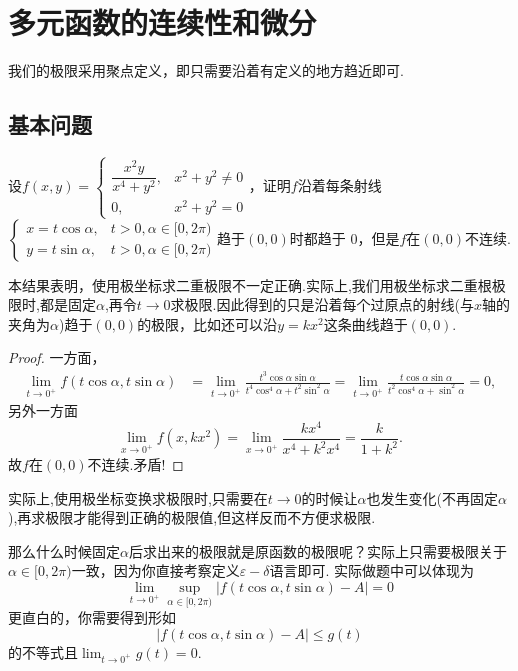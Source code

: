\documentclass[../../main.tex]{subfiles}%
\begin{document}
\section{多元函数的连续性和微分}

我们的极限采用聚点定义，即只需要沿着有定义的地方趋近即可.

\subsection{基本问题}

\begin{example}
设\(f(x,y)=\begin{cases}\dfrac{x^2 y}{x^4 + y^2},&x^2 + y^2 \neq 0\\0,&x^2 + y^2 = 0\end{cases}\)，证明\(f\)沿着每条射线\(\begin{cases}x = t\cos\alpha,&t > 0,\alpha \in [0,2\pi)\\y = t\sin\alpha,&t > 0,\alpha \in [0,2\pi)\end{cases}\)趋于\((0,0)\)时都趋于 0，但是\(f\)在\((0,0)\)不连续.
\end{example}
\begin{note}
本结果表明，使用极坐标求二重极限不一定正确.实际上,我们用极坐标求二重根极限时,都是固定$\alpha$,再令$t\to 0$求极限.因此得到的只是沿着每个过原点的射线(与$x$轴的夹角为$\alpha$)趋于$(0,0)$的极限，比如还可以沿$y=kx^2$这条曲线趋于$(0,0)$.
\end{note}
\begin{proof}
一方面，
\begin{align*}
\lim_{t \to 0^+} f(t\cos\alpha, t\sin\alpha)&=\lim_{t \to 0^+} \frac{t^3 \cos\alpha \sin\alpha}{t^4 \cos^4 \alpha + t^2 \sin^2 \alpha} = \lim_{t \to 0^+} \frac{t \cos\alpha \sin\alpha}{t^2 \cos^4 \alpha + \sin^2 \alpha} = 0,
\end{align*}
另外一方面
\[
\lim_{x \to 0^+} f(x, kx^2)=\lim_{x \to 0^+} \frac{kx^4}{x^4 + k^2 x^4}=\frac{k}{1 + k^2}.
\]
故\(f\)在\((0,0)\)不连续.矛盾!
\end{proof}
\begin{remark}
实际上,使用极坐标变换求极限时,只需要在$t\to 0$的时候让$\alpha$也发生变化(不再固定$\alpha$),再求极限才能得到正确的极限值,但这样反而不方便求极限.

那么什么时候固定$\alpha$后求出来的极限就是原函数的极限呢？实际上只需要极限关于\(\alpha \in [0,2\pi)\)一致，因为你直接考察定义\(\varepsilon - \delta\)语言即可. 实际做题中可以体现为
\[
\lim_{t \to 0^+} \sup_{\alpha \in [0,2\pi)} |f(t\cos\alpha, t\sin\alpha) - A| = 0
\]
更直白的，你需要得到形如
\[
|f(t\cos\alpha, t\sin\alpha) - A| \leqslant g(t)
\]
的不等式且\(\lim_{t \to 0^+} g(t) = 0\).
\end{remark}
\end{document}
